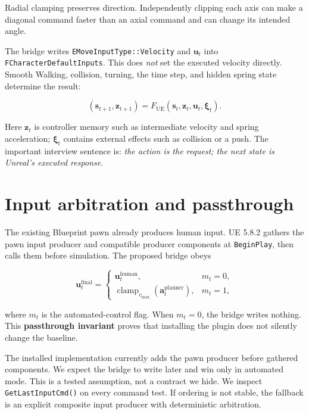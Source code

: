 \documentclass[11pt]{article}
\begin{document}
Radial clamping preserves direction. Independently clipping each axis can make a diagonal command
faster than an axial command and can change its intended angle.

The bridge writes \texttt{EMoveInputType::Velocity} and $\mathbf{u}_t$ into
\texttt{FCharacterDefaultInputs}. This does \emph{not} set the executed velocity directly. Smooth
Walking, collision, turning, the time step, and hidden spring state determine the result:

\begin{equation}
  (\mathbf{s}_{t+1},\mathbf{z}_{t+1}) =
  F_{\mathrm{UE}}(\mathbf{s}_t,\mathbf{z}_t,\mathbf{u}_t,\boldsymbol{\xi}_t).
\end{equation}

Here $\mathbf{z}_t$ is controller memory such as intermediate velocity and spring acceleration;
$\boldsymbol{\xi}_t$ contains external effects such as collision or a push. The important interview
sentence is: \emph{the action is the request; the next state is Unreal's executed response}.

\section{Input arbitration and passthrough}\label{sec:arbitration}

The existing Blueprint pawn already produces human input. UE 5.8.2 gathers the pawn input producer
and compatible producer components at \texttt{BeginPlay}, then calls them before simulation. The
proposed bridge obeys

\begin{equation}
  \mathbf{u}^{\mathrm{final}}_t =
  \begin{cases}
    \mathbf{u}^{\mathrm{human}}_t, & m_t=0,\\
    \operatorname{clamp}_{v_{\max}}(\mathbf{a}^{\mathrm{planner}}_t), & m_t=1,
  \end{cases}
\end{equation}

where $m_t$ is the automated-control flag. When $m_t=0$, the bridge writes nothing. This
\textbf{passthrough invariant} proves that installing the plugin does not silently change the
baseline.

The installed implementation currently adds the pawn producer before gathered components. We
expect the bridge to write later and win only in automated mode. This is a tested assumption, not a
contract we hide. We inspect \texttt{GetLastInputCmd()} on every command test. If ordering is not
stable, the fallback is an explicit composite input producer with deterministic arbitration.
\end{document}
